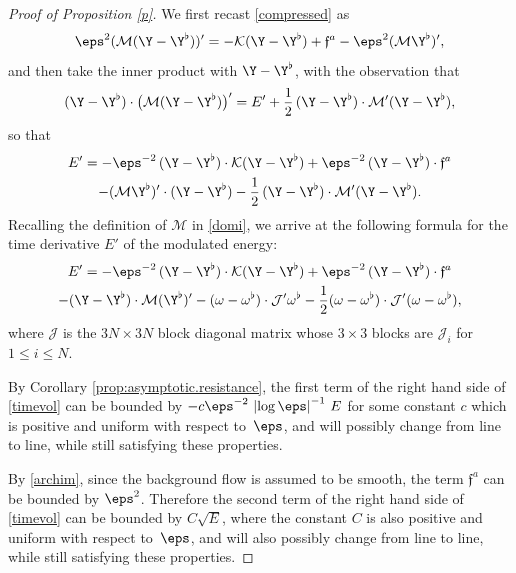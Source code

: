 \begin{proof}[Proof of Proposition \ref{p}]
We first recast \eqref{compressed} as
\begin{equation*}
\eps^2 (\mathcal{M} (\Y- \Y^\flat))'
=
- \mathcal K (\Y - \Y^\flat) + \mathfrak{f}^a
- \eps^2 (\mathcal{M} \Y^\flat)',
\end{equation*}
and then take the inner product with $\Y- \Y^\flat $, with the observation that
\begin{equation*}
(\Y - \Y^\flat) \cdot \big(\mathcal{M} (\Y - \Y^\flat) \big)' = E'
+ \frac 1 2\, (\Y - \Y^\flat) \cdot \mathcal{M}' (\Y - \Y^\flat),
\end{equation*}
so that
\begin{multline*}
E'=-{\eps^{-2}\, }
(\Y - \Y^\flat)
\cdot \mathcal K (\Y - \Y^\flat)
+ {\eps^{-2}\, }
(\Y - \Y^\flat)
\cdot \mathfrak{f}^a
\\
- (\mathcal{M} \Y^\flat)' \cdot (\Y - \Y^\flat)
- \frac 1 2\, (\Y - \Y^\flat) \cdot \mathcal{M}' (\Y - \Y^\flat).
\end{multline*}
Recalling the definition of $\mathcal{M}$ in \eqref{domi},
we arrive at
the following formula for the time derivative $E'$ of the modulated energy:
\begin{multline}
\label{timevol}
E' = -{\eps^{-2}\, }
(\Y - \Y^\flat)
\cdot \mathcal K (\Y - \Y^\flat)
+ {\eps^{-2}\, }
(\Y - \Y^\flat)
\cdot \mathfrak{f}^a
\\
- (\Y - \Y^\flat) \cdot
\mathcal{M} (\Y^\flat)' - (\omega - \omega^\flat) \cdot \mathcal J' \omega^\flat
- \frac 1 2 (\omega - \omega^\flat) \cdot \mathcal J' (\omega - \omega^\flat),
\end{multline}
where $\mathcal{J}$ is the $3N \times 3N$ block diagonal matrix whose $3 \times 3$ blocks are
$ \mathcal{J}_i $ for $1 \leq i \leq N$.

By Corollary \ref{prop:asymptotic.resistance},
the first term of the right hand side of \eqref{timevol} can be bounded by $ - c {\eps^{-2}\, } \left|\log \eps\right|^{-1}\, E $ for some constant $c$ which is positive and uniform with respect to~$\eps$, and will possibly change from line to line, while still satisfying these properties.

By
\eqref{archim}, since the background flow is assumed to be smooth, the term $\mathfrak{f}^a $ can be bounded by ${\eps^{2} }$. Therefore the second term of the right hand side of \eqref{timevol} can be bounded by
$C \sqrt E $, where the constant $C$ is also positive and uniform with respect to~$\eps$, and will also possibly change from line to line, while still satisfying these properties.


\end{proof}
